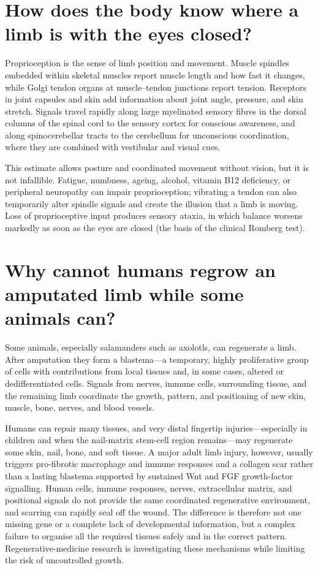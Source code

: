 \documentclass[11pt,oneside]{report}
\begin{document}
\section{How does the body know where a limb is with the eyes closed?}

Proprioception is the sense of limb position and movement. Muscle spindles
embedded within skeletal muscles report muscle length and how fast it changes,
while Golgi tendon organs at muscle--tendon junctions report tension. Receptors
in joint capsules and skin add information about joint angle, pressure, and
skin stretch. Signals travel rapidly along large myelinated sensory fibres in
the dorsal columns of the spinal cord to the sensory cortex for conscious
awareness, and along spinocerebellar tracts to the cerebellum for unconscious
coordination, where they are combined with vestibular and visual cues.

This estimate allows posture and coordinated movement without vision, but it
is not infallible. Fatigue, numbness, ageing, alcohol, vitamin B12 deficiency,
or peripheral neuropathy can impair proprioception; vibrating a tendon can also
temporarily alter spindle signals and create the illusion that a limb is
moving. Loss of proprioceptive input produces sensory ataxia, in which balance
worsens markedly as soon as the eyes are closed (the basis of the clinical
Romberg test).

\section{Why cannot humans regrow an amputated limb while some animals can?}

Some animals, especially salamanders such as axolotls, can regenerate a limb.
After amputation they form a blastema---a temporary, highly proliferative group
of cells with contributions from local tissues and, in some cases, altered or
dedifferentiated cells. Signals from nerves, immune cells, surrounding tissue,
and the remaining limb coordinate the growth, pattern, and positioning of new
skin, muscle, bone, nerves, and blood vessels.

Humans can repair many tissues, and very distal fingertip injuries---especially
in children and when the nail-matrix stem-cell region remains---may regenerate
some skin, nail, bone, and soft tissue. A major adult limb injury, however,
usually triggers pro-fibrotic macrophage and immune responses and a collagen
scar rather than a lasting blastema supported by sustained Wnt and FGF
growth-factor signalling.
Human cells, immune responses, nerves, extracellular matrix, and positional
signals do not provide the same coordinated regenerative environment, and
scarring can rapidly seal off the wound. The difference is therefore not one
missing gene or a complete lack of developmental information, but a complex
failure to organise all the required tissues safely and in the correct pattern.
Regenerative-medicine research is investigating these mechanisms while
limiting the risk of uncontrolled growth.
\end{document}

